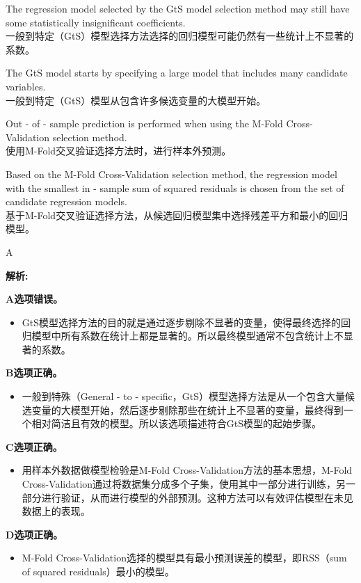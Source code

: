\documentclass{article}
\newenvironment{explanation}
{\textbf{解析:}\par}
{\par}
\begin{document}
    \begin{choices}
        \item The regression model selected by the GtS model selection method may still have some statistically insignificant coefficients.\\
        一般到特定（GtS）模型选择方法选择的回归模型可能仍然有一些统计上不显著的系数。
        \item The GtS model starts by specifying a large model that includes many candidate variables.\\
        一般到特定（GtS）模型从包含许多候选变量的大模型开始。
        \item Out - of - sample prediction is performed when using the M-Fold Cross-Validation selection method.\\
        使用M-Fold交叉验证选择方法时，进行样本外预测。
        \item Based on the M-Fold Cross-Validation selection method, the regression model with the smallest in - sample sum of squared residuals is chosen from the set of candidate regression models.\\
        基于M-Fold交叉验证选择方法，从候选回归模型集中选择残差平方和最小的回归模型。
    \end{choices}
    
    \begin{correctanswer}
        A
    \end{correctanswer}
    
    \begin{explanation}
    
    \textbf{A选项错误。}
    \begin{itemize}
        \item GtS模型选择方法的目的就是通过逐步剔除不显著的变量，使得最终选择的回归模型中所有系数在统计上都是显著的。所以最终模型通常不包含统计上不显著的系数。
    \end{itemize}
    \textbf{B选项正确。}
    \begin{itemize}
        \item 一般到特殊（General - to - specific，GtS）模型选择方法是从一个包含大量候选变量的大模型开始，然后逐步剔除那些在统计上不显著的变量，最终得到一个相对简洁且有效的模型。所以该选项描述符合GtS模型的起始步骤。
    \end{itemize}
    \textbf{C选项正确。}
    \begin{itemize}
        \item 用样本外数据做模型检验是M-Fold Cross-Validation方法的基本思想，M-Fold Cross-Validation通过将数据集分成多个子集，使用其中一部分进行训练，另一部分进行验证，从而进行模型的外部预测。这种方法可以有效评估模型在未见数据上的表现。
    \end{itemize}
    
    \textbf{D选项正确。}
    \begin{itemize}
        \item M-Fold Cross-Validation选择的模型具有最小预测误差的模型，即RSS（sum of squared residuals）最小的模型。
    \end{itemize}
    \end{explanation}
    
\end{document}
